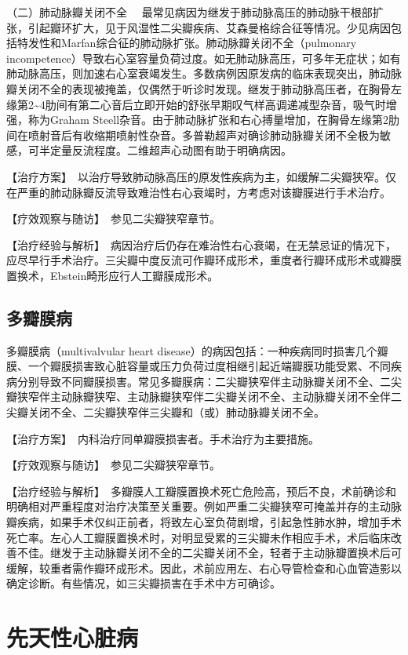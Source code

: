 {（二）肺动脉瓣关闭不全}
　最常见病因为继发于肺动脉高压的肺动脉干根部扩张，引起瓣环扩大，见于风湿性二尖瓣疾病、艾森曼格综合征等情况。少见病因包括特发性和Marfan综合征的肺动脉扩张。肺动脉瓣关闭不全（pulmonary
incompetence）导致右心室容量负荷过度。如无肺动脉高压，可多年无症状；如有肺动脉高压，则加速右心室衰竭发生。多数病例因原发病的临床表现突出，肺动脉瓣关闭不全的表现被掩盖，仅偶然于听诊时发现。继发于肺动脉高压者，在胸骨左缘第2\textasciitilde{}4肋间有第二心音后立即开始的舒张早期叹气样高调递减型杂音，吸气时增强，称为Graham
Steell杂音。由于肺动脉扩张和右心搏量增加，在胸骨左缘第2肋间在喷射音后有收缩期喷射性杂音。多普勒超声对确诊肺动脉瓣关闭不全极为敏感，可半定量反流程度。二维超声心动图有助于明确病因。

【治疗方案】　以治疗导致肺动脉高压的原发性疾病为主，如缓解二尖瓣狭窄。仅在严重的肺动脉瓣反流导致难治性右心衰竭时，方考虑对该瓣膜进行手术治疗。

【疗效观察与随访】　参见二尖瓣狭窄章节。

【治疗经验与解析】　病因治疗后仍存在难治性右心衰竭，在无禁忌证的情况下，应尽早行手术治疗。三尖瓣中度反流可作瓣环成形术，重度者行瓣环成形术或瓣膜置换术，Ebstein畸形应行人工瓣膜成形术。

\subsection{多瓣膜病}

多瓣膜病（multivalvular heart
disease）的病因包括：一种疾病同时损害几个瓣膜、一个瓣膜损害致心脏容量或压力负荷过度相继引起近端瓣膜功能受累、不同疾病分别导致不同瓣膜损害。常见多瓣膜病：二尖瓣狭窄伴主动脉瓣关闭不全、二尖瓣狭窄伴主动脉瓣狭窄、主动脉瓣狭窄伴二尖瓣关闭不全、主动脉瓣关闭不全伴二尖瓣关闭不全、二尖瓣狭窄伴三尖瓣和（或）肺动脉瓣关闭不全。

【治疗方案】　内科治疗同单瓣膜损害者。手术治疗为主要措施。

【疗效观察与随访】　参见二尖瓣狭窄章节。

【治疗经验与解析】　多瓣膜人工瓣膜置换术死亡危险高，预后不良，术前确诊和明确相对严重程度对治疗决策至关重要。例如严重二尖瓣狭窄可掩盖并存的主动脉瓣疾病，如果手术仅纠正前者，将致左心室负荷剧增，引起急性肺水肿，增加手术死亡率。左心人工瓣膜置换术时，对明显受累的三尖瓣未作相应手术，术后临床改善不佳。继发于主动脉瓣关闭不全的二尖瓣关闭不全，轻者于主动脉瓣置换术后可缓解，较重者需作瓣环成形术。因此，术前应用左、右心导管检查和心血管造影以确定诊断。有些情况，如三尖瓣损害在手术中方可确诊。


\section{先天性心脏病}


